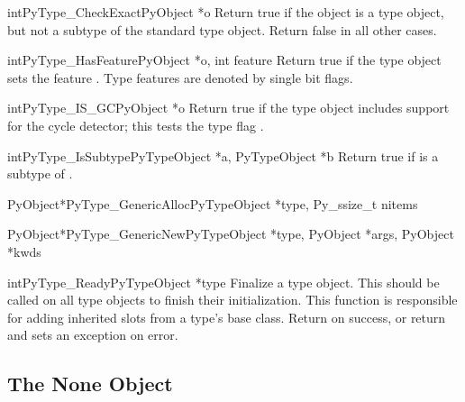 \begin{cfuncdesc}{int}{PyType_CheckExact}{PyObject *o}
  Return true if the object  is a type object, but not a
  subtype of the standard type object.  Return false in all other
  cases.
\end{cfuncdesc}

\begin{cfuncdesc}{int}{PyType_HasFeature}{PyObject *o, int feature}
  Return true if the type object  sets the feature
  .  Type features are denoted by single bit flags.
\end{cfuncdesc}

\begin{cfuncdesc}{int}{PyType_IS_GC}{PyObject *o}
  Return true if the type object includes support for the cycle
  detector; this tests the type flag .
\end{cfuncdesc}

\begin{cfuncdesc}{int}{PyType_IsSubtype}{PyTypeObject *a, PyTypeObject *b}
  Return true if  is a subtype of .
\end{cfuncdesc}

\begin{cfuncdesc}{PyObject*}{PyType_GenericAlloc}{PyTypeObject *type,
                                                  Py_ssize_t nitems}
\end{cfuncdesc}

\begin{cfuncdesc}{PyObject*}{PyType_GenericNew}{PyTypeObject *type,
                                            PyObject *args, PyObject *kwds}
\end{cfuncdesc}

\begin{cfuncdesc}{int}{PyType_Ready}{PyTypeObject *type}
  Finalize a type object.  This should be called on all type objects
  to finish their initialization.  This function is responsible for
  adding inherited slots from a type's base class.  Return 
  on success, or return  and sets an exception on error.
\end{cfuncdesc}


\subsection{The None Object \label{noneObject}}

